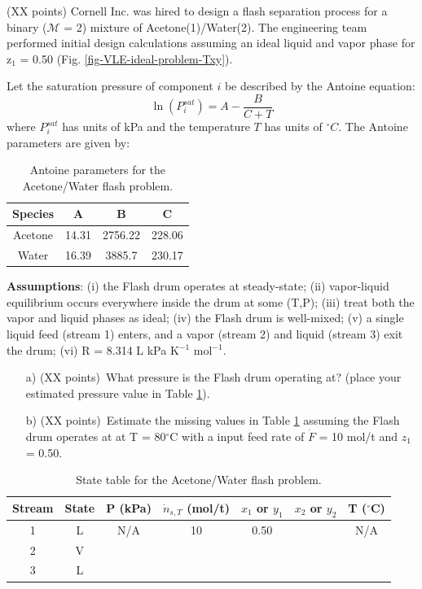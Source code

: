 \item{(XX points)
Cornell Inc. was hired to design a flash separation process for a binary ($\mathcal{M}$ = 2) mixture of Acetone(1)/Water(2).
The engineering team performed initial design calculations assuming an ideal liquid and vapor phase for z$_{1}$ = 0.50
(Fig. \ref{fig-VLE-ideal-problem-Txy}). 

Let the saturation pressure of component $i$ be described by the Antoine equation:
\begin{equation}
  \ln\left(P_{i}^{sat}\right) = A - \frac{B}{C+T}
\end{equation}where $P_{i}^{sat}$ has units of kPa and the temperature $T$ has units of $^{\circ}C$.
The Antoine parameters are given by:

\begin{table}[!ht]
  \centering
  \caption{Antoine parameters for the Acetone/Water flash problem.}
  \setlength{\tabcolsep}{18pt}
  \begin{tabular}{c|c|c|c}\toprule
    Species & A & B & C \\ \toprule
    Acetone & 14.31 & 2756.22 & 228.06 \\
    Water & 16.39 & 3885.7 & 230.17 \\\bottomrule
  \end{tabular}
\end{table}

\textbf{Assumptions}: (i) the Flash drum operates at steady-state;
(ii) vapor-liquid equilibrium occurs everywhere inside the drum at some (T,P);
(iii) treat both the vapor and liquid phases as ideal;
(iv) the Flash drum is well-mixed;
(v) a single liquid feed (stream 1) enters, and a vapor (stream 2) and liquid (stream 3) exit the drum;
(vi) R = 8.314 L kPa K$^{-1}$ mol$^{-1}$.

\begin{itemize}
    \item[a)]{(XX points)~What pressure is the Flash drum operating at? (place your estimated pressure value in Table
    \ref{tbl-state-flash-problem-txy}).}
    \item[b)]{(XX points)~Estimate the missing values in Table \ref{tbl-state-flash-problem-txy} assuming the Flash drum operates at at T = 80$^{\circ}$C with a input feed rate of $\dot{F}$ = 10 mol/t and $z_{1}$ = 0.50.}
  \end{itemize}

  \clearpage

\begin{table}[!ht]
    \centering
    \caption{State table for the Acetone/Water flash problem.}\label{tbl-state-flash-problem-txy}
    \renewcommand{\arraystretch}{2.0}
    \setlength{\tabcolsep}{18pt}
    \begin{tabular}{c|c|c|c|c|c|c}\toprule
    Stream & State & P (kPa) & $\dot{n}_{s,T}$ (mol/t) & $x_{1}$ or $y_{1}$ & $x_{2}$ or $y_{2}$ & T ($^{\circ}$C) \\ \toprule
    1 & L & N/A & 10 & 0.50 &  & N/A \\ \hline
    2 & V & & & & &  \\ \hline
    3 & L & & & & &  \\ \bottomrule
    \end{tabular}
  \end{table}
}